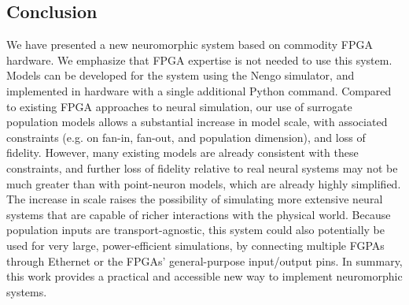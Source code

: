 \documentclass[english]{article}
\begin{document}
\subsection{Conclusion}
We have presented a new neuromorphic system based on commodity FPGA hardware. We emphasize that FPGA expertise is not needed to use this system. Models can be developed for the system using the Nengo simulator, and implemented in hardware with a single additional Python command. 
Compared to existing FPGA approaches to neural simulation, our use of surrogate population models allows a substantial increase in model scale, with associated constraints (e.g. on fan-in, fan-out, and population dimension), and loss of fidelity. 
However, many existing models are already consistent with these constraints, and further loss of fidelity relative to real neural systems may not be much greater than with point-neuron models, which are already highly simplified. 
The increase in scale raises the possibility of simulating more extensive neural systems that are capable of richer interactions with the physical world. 
Because population inputs are transport-agnostic, this system could also potentially be used for very large, power-efficient simulations, by connecting multiple FGPAs through Ethernet or the FPGAs' general-purpose input/output pins. 
In summary, this work provides a practical and accessible new way to implement neuromorphic systems. 



\end{document}
